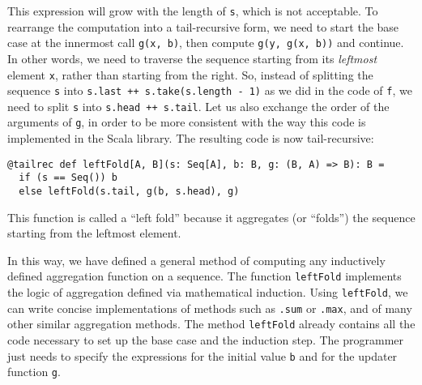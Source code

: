 This expression will grow with the length of \lstinline!s!,
which is not acceptable. To rearrange the computation into a tail-recursive
form, we need to start the base case at the innermost call \lstinline!g(x, b)!,
then compute \lstinline!g(y, g(x, b))!
and continue. In other words, we need to traverse the sequence starting
from its \emph{leftmost} element \lstinline!x!,
rather than starting from the right. So, instead of splitting the
sequence \lstinline!s!
into \lstinline!s.last ++ s.take(s.length - 1)!
as we did in the code of \lstinline!f!,
we need to split \lstinline!s!
into \lstinline!s.head ++ s.tail!.
Let us also exchange the order of the arguments of \lstinline!g!,
in order to be more consistent with the way this code is implemented
in the Scala library. The resulting code is now tail-recursive:
\begin{lstlisting}
@tailrec def leftFold[A, B](s: Seq[A], b: B, g: (B, A) => B): B =
  if (s == Seq()) b
  else leftFold(s.tail, g(b, s.head), g)
\end{lstlisting}
This function is called a ``left fold'' because it aggregates (or
``folds'') the sequence starting from the leftmost element.

In this way, we have defined a general method of computing any inductively
defined aggregation function on a sequence. The function \lstinline!leftFold!
implements the logic of aggregation defined via
mathematical induction. Using \lstinline!leftFold!,
we can write concise implementations of methods such as \lstinline!.sum!
or \lstinline!.max!, and
of many other similar aggregation methods. The method \lstinline!leftFold!
already contains all the code necessary to set up the base case and
the induction step. The programmer just needs to specify the expressions
for the initial value \lstinline!b!
and for the updater function \lstinline!g!.

